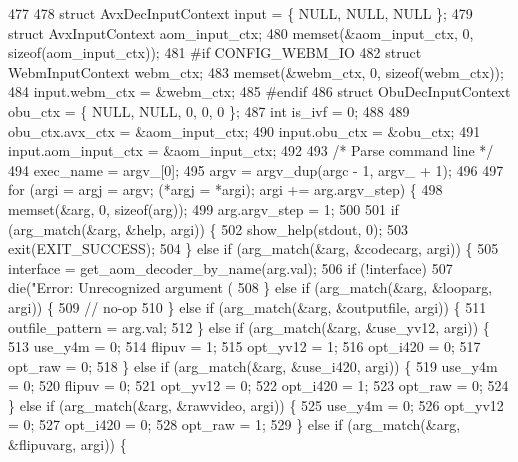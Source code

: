 \begin{DoxyCodeInclude}
{{{{{{{{{{{{{{{{{{{{{{{{{477 
478   \textcolor{keyword}{struct }AvxDecInputContext input = \{ NULL, NULL, NULL \};
479   \textcolor{keyword}{struct }AvxInputContext aom\_input\_ctx;
480   memset(&aom\_input\_ctx, 0, \textcolor{keyword}{sizeof}(aom\_input\_ctx));
481 \textcolor{preprocessor}{#if CONFIG\_WEBM\_IO}
482   \textcolor{keyword}{struct }WebmInputContext webm\_ctx;
483   memset(&webm\_ctx, 0, \textcolor{keyword}{sizeof}(webm\_ctx));
484   input.webm\_ctx = &webm\_ctx;
485 \textcolor{preprocessor}{#endif}
486   \textcolor{keyword}{struct }ObuDecInputContext obu\_ctx = \{ NULL, NULL, 0, 0, 0 \};
487   \textcolor{keywordtype}{int} is\_ivf = 0;
488 
489   obu\_ctx.avx\_ctx = &aom\_input\_ctx;
490   input.obu\_ctx = &obu\_ctx;
491   input.aom\_input\_ctx = &aom\_input\_ctx;
492 
493   \textcolor{comment}{/* Parse command line */}
494   exec\_name = argv\_[0];
495   argv = argv\_dup(argc - 1, argv\_ + 1);
496 
497   \textcolor{keywordflow}{for} (argi = argj = argv; (*argj = *argi); argi += arg.argv\_step) \{
498     memset(&arg, 0, \textcolor{keyword}{sizeof}(arg));
499     arg.argv\_step = 1;
500 
501     \textcolor{keywordflow}{if} (arg\_match(&arg, &help, argi)) \{
502       show\_help(stdout, 0);
503       exit(EXIT\_SUCCESS);
504     \} \textcolor{keywordflow}{else} \textcolor{keywordflow}{if} (arg\_match(&arg, &codecarg, argi)) \{
505       \textcolor{keyword}{interface }= get\_aom\_decoder\_by\_name(arg.val);
506       \textcolor{keywordflow}{if} (!interface)
507         die(\textcolor{stringliteral}{"Error: Unrecognized argument (%
508     \} \textcolor{keywordflow}{else} \textcolor{keywordflow}{if} (arg\_match(&arg, &looparg, argi)) \{
509       \textcolor{comment}{// no-op}
510     \} \textcolor{keywordflow}{else} \textcolor{keywordflow}{if} (arg\_match(&arg, &outputfile, argi)) \{
511       outfile\_pattern = arg.val;
512     \} \textcolor{keywordflow}{else} \textcolor{keywordflow}{if} (arg\_match(&arg, &use\_yv12, argi)) \{
513       use\_y4m = 0;
514       flipuv = 1;
515       opt\_yv12 = 1;
516       opt\_i420 = 0;
517       opt\_raw = 0;
518     \} \textcolor{keywordflow}{else} \textcolor{keywordflow}{if} (arg\_match(&arg, &use\_i420, argi)) \{
519       use\_y4m = 0;
520       flipuv = 0;
521       opt\_yv12 = 0;
522       opt\_i420 = 1;
523       opt\_raw = 0;
524     \} \textcolor{keywordflow}{else} \textcolor{keywordflow}{if} (arg\_match(&arg, &rawvideo, argi)) \{
525       use\_y4m = 0;
526       opt\_yv12 = 0;
527       opt\_i420 = 0;
528       opt\_raw = 1;
529     \} \textcolor{keywordflow}{else} \textcolor{keywordflow}{if} (arg\_match(&arg, &flipuvarg, argi)) \{
}}}}}}}}}}}}}}}}}}}}}}}}}}
\end{DoxyCodeInclude}
